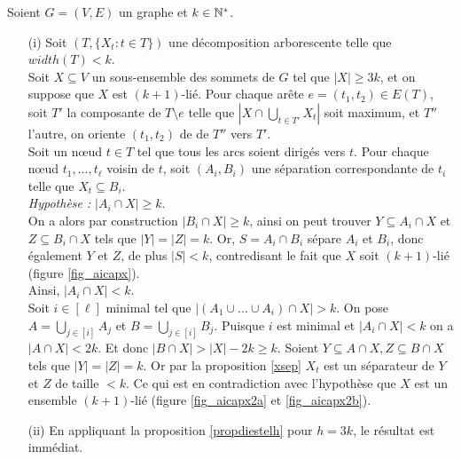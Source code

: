 	Soient $G = (V,E)$ un graphe et $k \in \mathbb{N}^*$.
	\begin{itemize}
		\item[(i)] 
		Soit $(T,\{X_t : t \in T\})$ une décomposition arborescente telle que $width(T) < k$.
		\\
		Soit $X \subseteq V$ un sous-ensemble des sommets de $G$ tel que $|X| \geq 3k$,
		et on suppose que $X$ est $(k+1)$-lié.
		Pour chaque arête $e = (t_1,t_2) \in E(T)$, soit $T'$ la composante de $T \setminus e$ telle que
		$|X \cap \bigcup\limits_{t\in T'}X_t|$ soit maximum, et $T''$ l'autre, on oriente $(t_1,t_2)$ de 
		de $T''$ vers $T'$.
		\\
		Soit un n\oe ud $t \in T$ tel que tous les arcs soient dirigés vers $t$.
		Pour chaque n\oe ud $t_1,...,t_\ell$ voisin de $t$, soit $(A_i,B_i)$ une
		séparation correspondante de $t_i$ telle que $X_t \subseteq B_i$.\\
		{\em Hypothèse :} $|A_i \cap X| \geq k$.\\
		On a alors par construction $|B_i \cap X| \geq k$, ainsi on peut trouver
		$Y \subseteq A_i \cap X$ et $Z \subseteq B_i \cap X$ tels que $|Y| = |Z| = k$.
		Or, $S = A_i \cap B_i$ sépare $A_i$ et $B_i$, donc également $Y$ et $Z$, de
		plus $|S| < k$, contredisant le fait que $X$ soit $(k+1)$-lié (figure \ref{fig_aicapx}).
		\\
		
		Ainsi, $|A_i \cap X| < k$.
		\\
		Soit $i \in [\ell]$ minimal tel que $|(A_1 \cup ... \cup A_i) \cap X| > k$.
		On pose $A = \bigcup\limits_{j \in [i]} A_j$ et 
		$B = \bigcup\limits_{j\in [i]} B_j$.
		Puisque $i$ est minimal et $|A_i \cap X| < k$ on a $|A \cap X| < 2k$.
		Et donc $|B\cap X| > |X| - 2k \geq k$.
		Soient $Y \subseteq A \cap X, Z \subseteq B\cap X$ tels que
		$|Y| = |Z| = k$.
		Or par la proposition \ref{xsep} $X_t$ est un séparateur de $Y$ et $Z$
		de taille $ < k$.
		Ce qui est en contradiction avec l'hypothèse que $X$ est un ensemble
		$(k+1)$-lié (figure \ref{fig_aicapx2a} et \ref{fig_aicapx2b}).
		\\
		
		
		
		\item[(ii)]
		En appliquant la proposition \ref{propdiestelh} pour $h = 3k$, le résultat est immédiat.


	\end{itemize}


